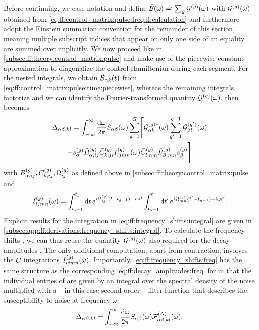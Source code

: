 Before continuing, we ease notation and define $\tilde{\mathcal{B}}(\omega) \eqqcolon \sum_g\mathcal{G}^{(g)}(\omega)$ with $\mathcal{G}^{(g)}(\omega)$ obtained from \cref{eq:ff:control_matrix:pulse:freq:ff:calculation} and furthermore adopt the Einstein summation convention for the remainder of this section, meaning multiple subscript indices that appear on only one side of an equality are summed over implicitly.
We now proceed like in \cref{subsec:ff:theory:control_matrix:pulse} and make use of the piecewise constant approximation to diagonalize the control Hamiltonian during each segment.
For the nested integrals, we obtain $\tilde{\mathcal{B}}_{\alpha k}(t)$ from \cref{eq:ff:control_matrix:pulse:time:piecewise}, whereas the remaining integrals factorize and we can identify the Fourier-transformed quantity $\mathcal{G}^{(g)}(\omega)$.
 then becomes
\begin{multline}\label{eq:ff:frequency_shifts:freq}
    \Delta_{\alpha\beta,kl} = \int_{-\infty}^\infty\frac{\dd{\omega}}{2\pi} S_{\alpha\beta}(\omega)\sum_{g=1}^G\Biggl[
        \mathcal{G}_{\alpha k}^{(g)\ast}(\omega)\sum_{g^\prime=1}^{g-1}\mathcal{G}_{\beta l}^{(g^\prime)}(\omega) \\
        + s_\alpha^{(g)}\bar{B}_{\alpha,ij}^{(g)}\bar{C}_{k,ji}^{(g)} I_{ijmn}^{(g)}(\omega)
        \bar{C}_{l,nm}^{(g)}\bar{B}_{\beta,mn}^{(g)} s_\beta^{(g)}
        \Biggr]
\end{multline}
with $\bar{B}_{\alpha,ij}^{(g)},\bar{C}_{k,ij}^{(g)},\Omega_{ij}^{(g)}$ as defined above in \cref{subsec:ff:theory:control_matrix:pulse} and
\begin{equation}\label{eq:ff:frequency_shifts:integral}
    I_{ijmn}^{(g)}(\omega) = \int_{t_{g-1}}^{t_g}\dd{t}e^{i\Omega_{ij}^{(g)}(t - t_{g-1}) - i\omega t}
        \int_{t_{g-1}}^{t}\dd{t'}e^{i\Omega_{mn}^{(g)}(t' - t_{g-1}) + i\omega t'}.
\end{equation}
Explicit results for the integration in \cref{eq:ff:frequency_shifts:integral} are given in \cref{subsec:app:ff:derivations:frequency_shifts:integral}.
To calculate the frequency shifts \freqshifts, we can thus reuse the quantity $\mathcal{G}^{(g)}(\omega)$ also required for the decay amplitudes \decayamps.
The only additional computation, apart from contraction, involves the $G$ integrations $I_{ijmn}^{(g)}(\omega)$.
Importantly, \cref{eq:ff:frequency_shifts:freq} has the same structure as the corresponding \cref{eq:ff:decay_amplitudes:freq} for \decayamps in that the individual entries of \freqshifts are given by an integral over the spectral density of the noise multiplied with a -- in this case second-order -- filter function that describes the susceptibility to noise at frequency $\omega$:
\begin{equation}\label{eq:ff:frequency_shifts:filter_function}
    \Delta_{\alpha\beta,kl} = \int_{-\infty}^\infty\frac{\dd{\omega}}{2\pi} S_{\alpha\beta}(\omega) \mathcal{F}_{\alpha\beta,kl}^{(\Delta)}(\omega).
\end{equation}

